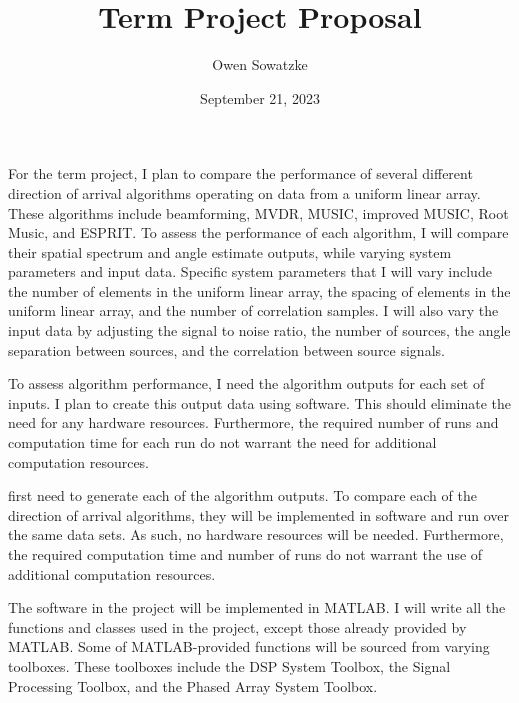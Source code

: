\documentclass{article}
\title{Term Project Proposal}
\author{Owen Sowatzke}
\date{September 21, 2023}
\begin{document}
	\maketitle

	For the term project, I plan to compare the performance of several different direction of arrival algorithms operating on data from a uniform linear array. These algorithms include beamforming, MVDR, MUSIC, improved MUSIC, Root Music, and ESPRIT. To assess the performance of each algorithm, I will compare their spatial spectrum and angle estimate outputs, while varying system parameters and input data. Specific system parameters that I will vary include the number of elements in the uniform linear array, the spacing of elements in the uniform linear array, and the number of correlation samples. I will also vary the input data by adjusting the signal to noise ratio, the number of sources, the angle separation between sources, and the correlation between source signals.
	
	To assess algorithm performance, I need the algorithm outputs for each set of inputs. I plan to create this output data using software. This should eliminate the need for any hardware resources. Furthermore, the required number of runs and computation time for each run do not warrant the need for additional computation resources.
	
	first need to generate each of the algorithm outputs. To compare each of the direction of arrival algorithms, they will be implemented in software and run over the same data sets. As such, no hardware resources will be needed. Furthermore, the required computation time and number of runs do not warrant the use of additional computation resources. 
	
	
	The software in the project will be implemented in MATLAB. I will write all the functions and classes used in the project, except those already provided by MATLAB. Some of MATLAB-provided functions will be sourced from varying toolboxes. These toolboxes include the DSP System Toolbox, the Signal Processing Toolbox, and the Phased Array System Toolbox.
	
	
\end{document}
